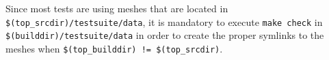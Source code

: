 \noindent Since most tests are using meshes that are located in
\verb+$(top_srcdir)/testsuite/data+, it is mandatory to execute \verb+make check+ in
\verb+$(builddir)/testsuite/data+ in order to create the proper
symlinks to the meshes when \verb+$(top_builddir) != $(top_srcdir)+.

%
%
